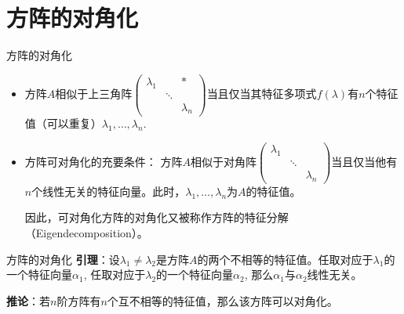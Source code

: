 \documentclass[10pt]{beamer}
\begin{document}

\section{方阵的对角化}


\begin{frame}

\begin{block}{方阵的对角化}
\begin{itemize}
\item 方阵$A$相似于上三角阵\(\displaystyle \begin{pmatrix} \lambda_1 & & * \\ & \ddots & \\ & & \lambda_n \end{pmatrix}\)当且仅当其特征多项式$f(\lambda)$有$n$个特征值（可以重复）$\lambda_1,\ldots,\lambda_n$.

\vspace{2em}
\pause

\item 方阵可对角化的充要条件：\newline
方阵$A$相似于对角阵\(\displaystyle \begin{pmatrix} \lambda_1 & & \\ & \ddots & \\ & & \lambda_n \end{pmatrix}\)当且仅当他有$n$个线性无关的特征向量。此时，$\lambda_1,\ldots,\lambda_n$为$A$的特征值。

\vspace{1em}
\pause

因此，可对角化方阵的对角化又被称作方阵的特征分解（Eigendecomposition）。
\end{itemize}
\end{block}

\end{frame}


\begin{frame}

\begin{block}{方阵的对角化}
{\bfseries 引理}：设$\lambda_1\neq\lambda_2$是方阵$A$的两个不相等的特征值。任取对应于$\lambda_1$的一个特征向量$\alpha_1$, 任取对应于$\lambda_2$的一个特征向量$\alpha_2$, 那么$\alpha_1$与$\alpha_2$线性无关。

\vspace{2em}
\pause

{\bfseries 推论}：若$n$阶方阵有$n$个互不相等的特征值，那么该方阵可以对角化。
\end{block}

\end{frame}
\end{document}
